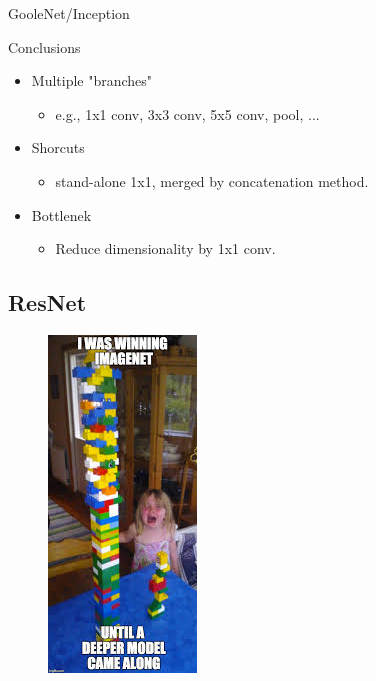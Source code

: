 \documentclass[aspectratio=169]{beamer}
\begin{document}
\begin{frame}{GooleNet/Inception}
\begin{alertblock}{Conclusions}
\begin{itemize}
    \item Multiple "branches"
    \begin{itemize}
        \item e.g., 1x1 conv, 3x3 conv, 5x5 conv, pool, ...
    \end{itemize}
    \item Shorcuts
    \begin{itemize}
        \item stand-alone 1x1, merged by concatenation method.
    \end{itemize}
    \item Bottlenek
    \begin{itemize}
        \item Reduce dimensionality by 1x1 conv.
    \end{itemize}
\end{itemize}
\end{alertblock}
\end{frame}

\subsection{ResNet}
\begin{frame}
\begin{center}
\begin{figure}
\includegraphics[scale=0.7]{demo/figs/meme.png}
\end{figure}
\end{center}
\end{frame}
\end{document}
